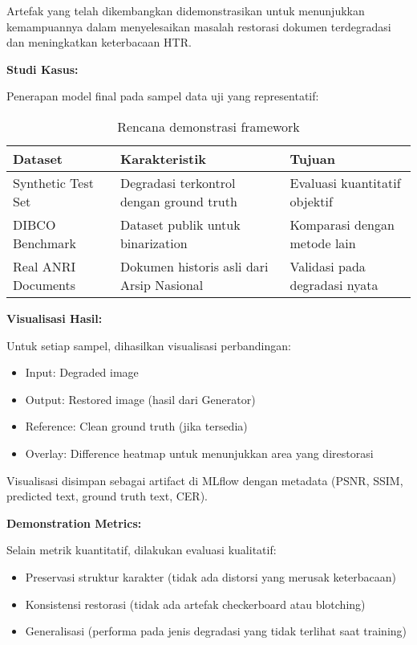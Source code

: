 \documentclass[12pt,a4paper]{article}
\begin{document}
Artefak yang telah dikembangkan didemonstrasikan untuk menunjukkan kemampuannya dalam menyelesaikan masalah restorasi dokumen terdegradasi dan meningkatkan keterbacaan HTR.

\textbf{Studi Kasus:}

Penerapan model final pada sampel data uji yang representatif:

\begin{table}[H]
\centering
\caption{Rencana demonstrasi framework}
\label{tab:demo-plan}
\small
\begin{tabular}{|l|p{5cm}|p{5cm}|}
\hline
\textbf{Dataset} & \textbf{Karakteristik} & \textbf{Tujuan} \\ \hline
Synthetic Test Set & Degradasi terkontrol dengan ground truth & Evaluasi kuantitatif objektif \\ \hline
DIBCO Benchmark & Dataset publik untuk binarization & Komparasi dengan metode lain \\ \hline
Real ANRI Documents & Dokumen historis asli dari Arsip Nasional & Validasi pada degradasi nyata \\ \hline
\end{tabular}
\end{table}

\textbf{Visualisasi Hasil:}

Untuk setiap sampel, dihasilkan visualisasi perbandingan:
\begin{itemize}[leftmargin=*, nosep]
\item Input: Degraded image
\item Output: Restored image (hasil dari Generator)
\item Reference: Clean ground truth (jika tersedia)
\item Overlay: Difference heatmap untuk menunjukkan area yang direstorasi
\end{itemize}

Visualisasi disimpan sebagai artifact di MLflow dengan metadata (PSNR, SSIM, predicted text, ground truth text, CER).

\textbf{Demonstration Metrics:}

Selain metrik kuantitatif, dilakukan evaluasi kualitatif:
\begin{itemize}[leftmargin=*, nosep]
\item Preservasi struktur karakter (tidak ada distorsi yang merusak keterbacaan)
\item Konsistensi restorasi (tidak ada artefak checkerboard atau blotching)
\item Generalisasi (performa pada jenis degradasi yang tidak terlihat saat training)
\end{itemize}
\end{document}

